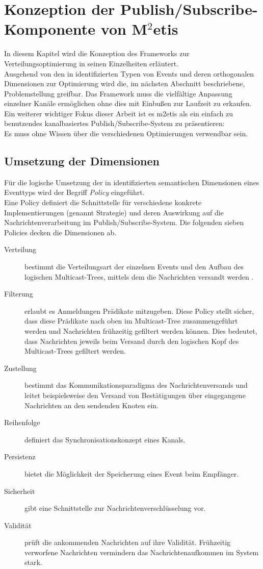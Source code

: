 \chapter[Konzeption der Publish/Subscribe-Komponente]{Konzeption der Publish/Subscribe-Komponente von M$^2$etis}
\label{chap:konzeption_pubsub}
In diesem Kapitel wird die Konzeption des Frameworks zur Verteilungsoptimierung in seinen Einzelheiten erläutert.\\
Ausgehend von den in \cite{Fischer2010a} identifizierten Typen von Events und deren orthogonalen Dimensionen zur Optimierung wird die, im nächsten Abschnitt beschriebene, Problemstellung greifbar. Das Framework muss die vielfältige Anpassung einzelner Kanäle ermöglichen ohne dies mit Einbußen zur Laufzeit zu erkaufen. Ein weiterer wichtiger Fokus dieser Arbeit ist es \ac{m2etis} als ein einfach zu benutzendes kanalbasiertes Publish/Subscribe-System zu präsentieren:\\
Es muss ohne Wissen über die verschiedenen Optimierungen verwendbar sein.



\section{Umsetzung der Dimensionen}
Für die logische Umsetzung der in \cite{Fischer2010Event} identifizierten semantischen Dimensionen eines Eventtyps wird der Begriff \emph{Policy} eingeführt.\\
Eine Policy definiert die Schnittstelle für verschiedene konkrete Implementierungen (genannt Strategie) und deren Auswirkung auf die Nachrichtenverarbeitung im Publish/Subscribe-System. Die folgenden sieben Policies decken die Dimensionen ab.

\begin{description}
\item[Verteilung] bestimmt die Verteilungsart der einzelnen Events und den Aufbau des logischen Multicast-Trees, mittels dem die Nachrichten versandt werden \cite{KostasKatrinis2005}.
\item[Filterung] erlaubt es Anmeldungen Prädikate mitzugeben. Diese Policy stellt sicher, dass diese Prädikate nach oben im Multicast-Tree zusammengeführt werden und Nachrichten frühzeitig gefiltert werden können. Dies bedeutet, dass Nachrichten jeweils beim Versand durch den logischen Kopf des Multicast-Trees gefiltert werden.
\item[Zustellung] bestimmt das Kommunikationsparadigma des Nachrichtenversands und leitet beispielsweise den Versand von Bestätigungen über eingegangene Nachrichten an den sendenden Knoten ein.
\item[Reihenfolge] definiert das Synchronisationskonzept eines Kanals.
\item[Persistenz] bietet die Möglichkeit der Speicherung eines Event beim Empfänger.
\item[Sicherheit] gibt eine Schnittstelle zur Nachrichtenverschlüsselung vor.
\item[Validität] prüft die ankommenden Nachrichten auf ihre Validität. Frühzeitig verworfene Nachrichten vermindern das Nachrichtenaufkommen im System stark.
\end{description}

